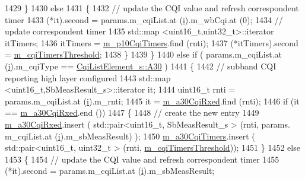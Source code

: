 \begin{DoxyCode}
1429             \}
1430           \textcolor{keywordflow}{else}
1431             \{
1432               \textcolor{comment}{// update the CQI value and refresh correspondent timer}
1433               (*it).second = params.m\_cqiList.at (\hyperlink{bernuolliDistribution_8m_a6f6ccfcf58b31cb6412107d9d5281426}{i}).m\_wbCqi.at (0);
1434               \textcolor{comment}{// update correspondent timer}
1435               std::map <uint16\_t,uint32\_t>::iterator itTimers;
1436               itTimers = \hyperlink{classns3_1_1PfFfMacScheduler_a5e1e3c699bc1b53b4c11f5bb454f7e1f}{m\_p10CqiTimers}.find (rnti);
1437               (*itTimers).second = \hyperlink{classns3_1_1PfFfMacScheduler_ad2377e8bcc02252e2f0d3ca0fc2895b9}{m\_cqiTimersThreshold};
1438             \}
1439         \}
1440       \textcolor{keywordflow}{else} \textcolor{keywordflow}{if} ( params.m\_cqiList.at (\hyperlink{bernuolliDistribution_8m_a6f6ccfcf58b31cb6412107d9d5281426}{i}).m\_cqiType == \hyperlink{structns3_1_1CqiListElement__s_a8f1bd827fd9842e7c07e39265d88299aab9a9d64494e36c89d7932a00edb056a7}{CqiListElement\_s::A30} )
1441         \{
1442           \textcolor{comment}{// subband CQI reporting high layer configured}
1443           std::map <uint16\_t,SbMeasResult\_s>::iterator it;
1444           uint16\_t rnti = params.m\_cqiList.at (\hyperlink{bernuolliDistribution_8m_a6f6ccfcf58b31cb6412107d9d5281426}{i}).m\_rnti;
1445           it = \hyperlink{classns3_1_1PfFfMacScheduler_a4bf7d1844112028aa3f7bc21e580a7bd}{m\_a30CqiRxed}.find (rnti);
1446           \textcolor{keywordflow}{if} (it == \hyperlink{classns3_1_1PfFfMacScheduler_a4bf7d1844112028aa3f7bc21e580a7bd}{m\_a30CqiRxed}.end ())
1447             \{
1448               \textcolor{comment}{// create the new entry}
1449               \hyperlink{classns3_1_1PfFfMacScheduler_a4bf7d1844112028aa3f7bc21e580a7bd}{m\_a30CqiRxed}.insert ( std::pair<uint16\_t, SbMeasResult\_s > (rnti, params.
      m\_cqiList.at (\hyperlink{bernuolliDistribution_8m_a6f6ccfcf58b31cb6412107d9d5281426}{i}).m\_sbMeasResult) );
1450               \hyperlink{classns3_1_1PfFfMacScheduler_abfaea62231103e914d6d66d66a127966}{m\_a30CqiTimers}.insert ( std::pair<uint16\_t, uint32\_t > (rnti, 
      \hyperlink{classns3_1_1PfFfMacScheduler_ad2377e8bcc02252e2f0d3ca0fc2895b9}{m\_cqiTimersThreshold}));
1451             \}
1452           \textcolor{keywordflow}{else}
1453             \{
1454               \textcolor{comment}{// update the CQI value and refresh correspondent timer}
1455               (*it).second = params.m\_cqiList.at (\hyperlink{bernuolliDistribution_8m_a6f6ccfcf58b31cb6412107d9d5281426}{i}).m\_sbMeasResult;

\end{DoxyCode}
